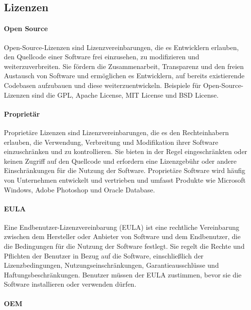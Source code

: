 \subsection{Lizenzen}
\label{sec:Lizenzen}

\paragraph{Open Source}

Open-Source-Lizenzen sind Lizenzvereinbarungen, die es Entwicklern erlauben, den Quellcode einer Software frei einzusehen, zu modifizieren und weiterzuverbreiten. Sie fördern die Zusammenarbeit, Transparenz und den freien Austausch von Software und ermöglichen es Entwicklern, auf bereits existierende Codebasen aufzubauen und diese weiterzuentwickeln. Beispiele für Open-Source-Lizenzen sind die GPL, Apache License, MIT License und BSD License.

\paragraph{Proprietär}

Proprietäre Lizenzen sind Lizenzvereinbarungen, die es den Rechteinhabern erlauben, die Verwendung, Verbreitung und Modifikation ihrer Software einzuschränken und zu kontrollieren. Sie bieten in der Regel eingeschränkten oder keinen Zugriff auf den Quellcode und erfordern eine Lizenzgebühr oder andere Einschränkungen für die Nutzung der Software. Proprietäre Software wird häufig von Unternehmen entwickelt und vertrieben und umfasst Produkte wie Microsoft Windows, Adobe Photoshop und Oracle Database.

\paragraph{EULA}

Eine Endbenutzer-Lizenzvereinbarung (EULA) ist eine rechtliche Vereinbarung zwischen dem Hersteller oder Anbieter von Software und dem Endbenutzer, die die Bedingungen für die Nutzung der Software festlegt. Sie regelt die Rechte und Pflichten der Benutzer in Bezug auf die Software, einschließlich der Lizenzbedingungen, Nutzungseinschränkungen, Garantieausschlüsse und Haftungsbeschränkungen. Benutzer müssen der EULA zustimmen, bevor sie die Software installieren oder verwenden dürfen.

\paragraph{OEM}

